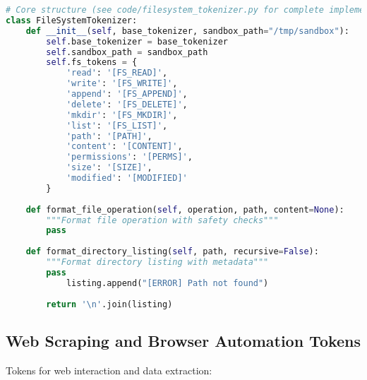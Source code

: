 \begin{lstlisting}[language=Python, caption=File system operation tokens]
# Core structure (see code/filesystem_tokenizer.py for complete implementation)
class FileSystemTokenizer:
    def __init__(self, base_tokenizer, sandbox_path="/tmp/sandbox"):
        self.base_tokenizer = base_tokenizer
        self.sandbox_path = sandbox_path
        self.fs_tokens = {
            'read': '[FS_READ]',
            'write': '[FS_WRITE]',
            'append': '[FS_APPEND]',
            'delete': '[FS_DELETE]',
            'mkdir': '[FS_MKDIR]',
            'list': '[FS_LIST]',
            'path': '[PATH]',
            'content': '[CONTENT]',
            'permissions': '[PERMS]',
            'size': '[SIZE]',
            'modified': '[MODIFIED]'
        }
    
    def format_file_operation(self, operation, path, content=None):
        """Format file operation with safety checks"""
        pass
    
    def format_directory_listing(self, path, recursive=False):
        """Format directory listing with metadata"""
        pass
            listing.append("[ERROR] Path not found")
        
        return '\n'.join(listing)
\end{lstlisting}

\subsection{Web Scraping and Browser Automation Tokens}

Tokens for web interaction and data extraction:

